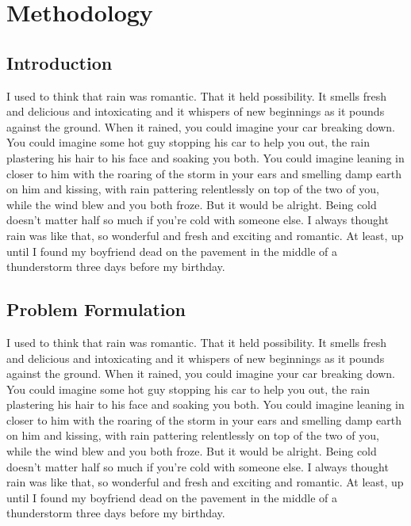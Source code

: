\chapter{Methodology}

\section{Introduction}

I used to think that rain was romantic. That it held possibility. It smells fresh and delicious and intoxicating and it whispers of new beginnings as it pounds against the ground. When it rained, you could imagine your car breaking down. You could imagine some hot guy stopping his car to help you out, the rain plastering his hair to his face and soaking you both. You could imagine leaning in closer to him with the roaring of the storm in your ears and smelling damp earth on him and kissing, with rain pattering relentlessly on top of the two of you, while the wind blew and you both froze. But it would be alright. Being cold doesn't matter half so much if you're cold with someone else.
I always thought rain was like that, so wonderful and fresh and exciting and romantic.
At least, up until I found my boyfriend dead on the pavement in the middle of a thunderstorm three days before my birthday.

\section{Problem Formulation}

I used to think that rain was romantic. That it held possibility. It smells fresh and delicious and intoxicating and it whispers of new beginnings as it pounds against the ground. When it rained, you could imagine your car breaking down. You could imagine some hot guy stopping his car to help you out, the rain plastering his hair to his face and soaking you both. You could imagine leaning in closer to him with the roaring of the storm in your ears and smelling damp earth on him and kissing, with rain pattering relentlessly on top of the two of you, while the wind blew and you both froze. But it would be alright. Being cold doesn't matter half so much if you're cold with someone else.
I always thought rain was like that, so wonderful and fresh and exciting and romantic.
At least, up until I found my boyfriend dead on the pavement in the middle of a thunderstorm three days before my birthday.

